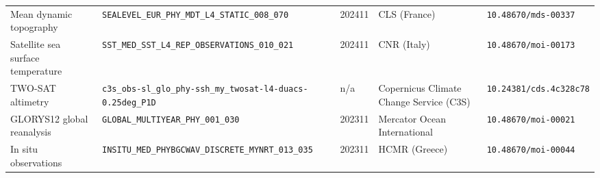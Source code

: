\begin{table}[htbp]
\begin{tabular}{@{}p{2.7cm}p{4.9cm}p{1.2cm}p{2.3cm}p{3.6cm}@{}}
    \raggedright\hspace{0pt}Mean dynamic topography & \raggedright\hspace{0pt}\nolinkurl{SEALEVEL_EUR_PHY_MDT_L4_STATIC_008_070} & \raggedright\hspace{0pt}202411 & \raggedright\hspace{0pt}CLS (France) & \raggedright\hspace{0pt}\nolinkurl{10.48670/mds-00337} \tabularnewline
    \raggedright\hspace{0pt}Satellite sea surface temperature & \raggedright\hspace{0pt}\nolinkurl{SST_MED_SST_L4_REP_OBSERVATIONS_010_021} & \raggedright\hspace{0pt}202411 & \raggedright\hspace{0pt}CNR (Italy) & \raggedright\hspace{0pt}\nolinkurl{10.48670/moi-00173} \tabularnewline
    \raggedright\hspace{0pt}TWO-SAT altimetry & \raggedright\hspace{0pt}\nolinkurl{c3s_obs-sl_glo_phy-ssh_my_twosat-l4-duacs-0.25deg_P1D} & \raggedright\hspace{0pt}n/a & \raggedright\hspace{0pt}Copernicus Climate Change Service (C3S) & \raggedright\hspace{0pt}\nolinkurl{10.24381/cds.4c328c78} \tabularnewline
    \midrule
    \raggedright\hspace{0pt}GLORYS12 global reanalysis & \raggedright\hspace{0pt}\nolinkurl{GLOBAL_MULTIYEAR_PHY_001_030} & \raggedright\hspace{0pt}202311 & \raggedright\hspace{0pt}Mercator Ocean International & \raggedright\hspace{0pt}\nolinkurl{10.48670/moi-00021} \tabularnewline
    \raggedright\hspace{0pt}In situ observations & \raggedright\hspace{0pt}\nolinkurl{INSITU_MED_PHYBGCWAV_DISCRETE_MYNRT_013_035} & \raggedright\hspace{0pt}202311 & \raggedright\hspace{0pt}HCMR (Greece) & \raggedright\hspace{0pt}\nolinkurl{10.48670/moi-00044} \tabularnewline
    \bottomrule
  \end{tabular}
\end{table}

